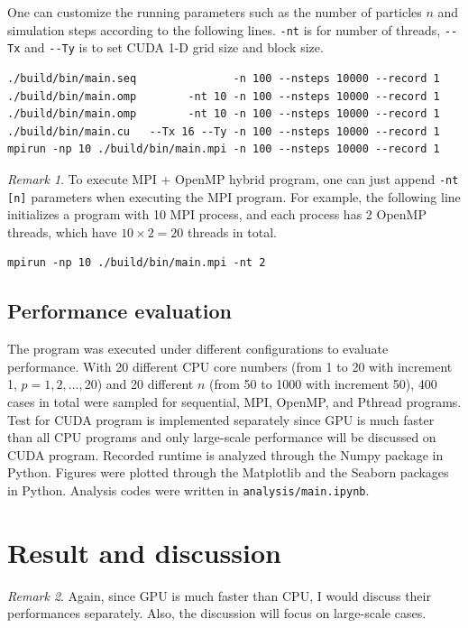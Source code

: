 \documentclass[twoside,12pt]{article}
\theoremstyle{definition}
\theoremstyle{remark}
\newtheorem*{remark}{Remark}
\begin{document}
One can customize the running parameters such as the number of particles $n$ and
simulation steps according to the following lines.
\lstinline|-nt| is for number of threads, \lstinline|--Tx| and \lstinline|--Ty|
is to set CUDA 1-D grid size and block size.
\begin{lstlisting}[style=sh]
./build/bin/main.seq               -n 100 --nsteps 10000 --record 1
./build/bin/main.omp        -nt 10 -n 100 --nsteps 10000 --record 1
./build/bin/main.omp        -nt 10 -n 100 --nsteps 10000 --record 1
./build/bin/main.cu   --Tx 16 --Ty -n 100 --nsteps 10000 --record 1
mpirun -np 10 ./build/bin/main.mpi -n 100 --nsteps 10000 --record 1
\end{lstlisting}
\begin{remark}
To execute MPI + OpenMP hybrid program, one can just append \lstinline|-nt [n]| parameters
when executing the MPI program.
For example, the following line initializes a program with 10 MPI process,
and each process has 2 OpenMP threads, which have $10\times 2=20$ threads in total.
\begin{lstlisting}[style=sh]
mpirun -np 10 ./build/bin/main.mpi -nt 2
\end{lstlisting}
\end{remark}


\subsection{Performance evaluation}
The program was executed under 
different configurations to evaluate performance.
With 20 different CPU core numbers (from 1 to 20 with increment 1, $p=1, 2,\dots, 20$)
and 20 different $n$ (from 50 to 1000 with increment 50),
400 cases in total were sampled for sequential, MPI, OpenMP, and Pthread programs.
Test for CUDA program is implemented separately since GPU is much faster
than all CPU programs and only large-scale performance will be discussed
on CUDA program.
Recorded runtime is analyzed through the Numpy
package in Python.
Figures were plotted through the Matplotlib and the Seaborn packages in Python.
Analysis codes were written in \lstinline|analysis/main.ipynb|.


\newpage
\section{Result and discussion}
\begin{remark}
Again, since GPU is much faster than CPU, I would discuss their
performances separately.
Also, the discussion will focus on large-scale cases.
\end{remark}
\end{document}

